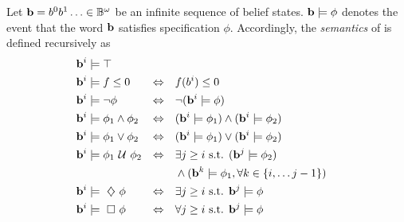\documentclass[conference]{IEEEtran}
\begin{document}
    \begin{definition}
    \label{def:gdtl-semantics}
    Let $\mathbf{b} = b^0b^1 \ldots \in \mathbb{B}^{\omega}$
    be an infinite sequence of belief states. $\mathbf{b} \models \phi$ denotes the event that the word $\mathbf{b}$ satisfies specification $\phi$. Accordingly, the {\em semantics} of \DTL is defined recursively as
    \begin{align*}
    &\BF{b}^i \models  \top  & \\
    &\BF{b}^i \models f \leq 0 & \Equiv\quad & f(b^i) \leq 0\\ %
    &\BF{b}^i \models \notltl \phi & \Equiv\quad & \notltl (\BF{b}^i \models \phi) \\
    &\BF{b}^i \models \phi_1 \andltl  \phi_2  & \Equiv\quad & ( \BF{b}^i \models \phi_1 ) \andltl ( \BF{b}^i \models \phi_2 ) \\
    &\BF{b}^i \models \phi_1 \orltl  \phi_2  & \Equiv\quad & ( \BF{b}^i \models \phi_1 ) \orltl ( \BF{b}^i \models \phi_2 ) \\
    &\BF{b}^i \models  \phi_1 \Until \phi_2 & \Equiv\quad & \exists j \geq i \text{ s.t. } ( \BF{b}^j \models \phi_2 ) \\
    & & & \andltl (\BF{b}^k \models \phi_1, \forall k \in \{i, \ldots j-1\})\\
    &\BF{b}^i \models \Event \phi  & \Equiv\quad & \exists j \geq i \text{ s.t. } \BF{b}^j \models \phi \\
    &\BF{b}^i \models \Always \phi  & \Equiv\quad & \forall j \geq i \text{ s.t. } \BF{b}^j \models \phi
    \end{align*}
    
    \end{definition}
\end{document}
